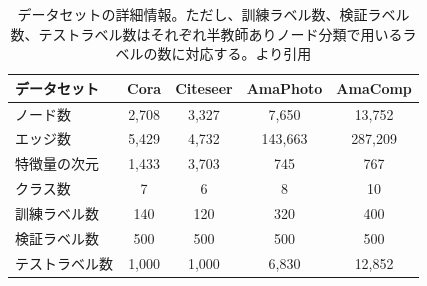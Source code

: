 \begin{table}[!t]
    \centering
    \caption{データセットの詳細情報。ただし、訓練ラベル数、検証ラベル数、テストラベル数はそれぞれ半教師ありノード分類で用いるラベルの数に対応する。\cite{taguchi2021graph}より引用}
    \label{tab:statdata}
    \begin{tabular}{l|cccc} \toprule
        データセット & Cora & Citeseer & AmaPhoto & AmaComp\\ \midrule
        ノード数 & 2,708 & 3,327 & 7,650 & 13,752\\
        エッジ数 & 5,429 & 4,732 & 143,663 & 287,209\\
        特徴量の次元 & 1,433 & 3,703 & 745 & 767\\
        クラス数 & 7 & 6 & 8 & 10\\
        訓練ラベル数 & 140 & 120 & 320 & 400\\
        検証ラベル数 & 500 & 500 & 500 & 500\\
        テストラベル数 & 1,000 & 1,000 & 6,830 & 12,852\\
        \bottomrule
    \end{tabular}
\end{table}

